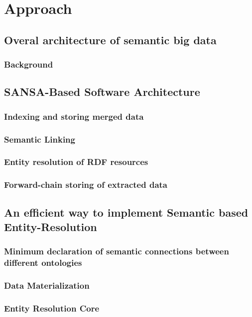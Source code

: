 \chapter{Approach}\label{ch:approach}
\section{Overal architecture of semantic big data}
\subsection{Background}
\section{SANSA-Based Software Architecture}
\subsection{Indexing and storing merged data}

\subsection{Semantic Linking}
\subsection{Entity resolution of RDF resources}
\subsection{Forward-chain storing of extracted data}

\section{An efficient way to implement Semantic based Entity-Resolution}
\subsection{Minimum declaration of semantic connections between different ontologies}
\subsection{Data Materialization}
\subsection{Entity Resolution Core}
